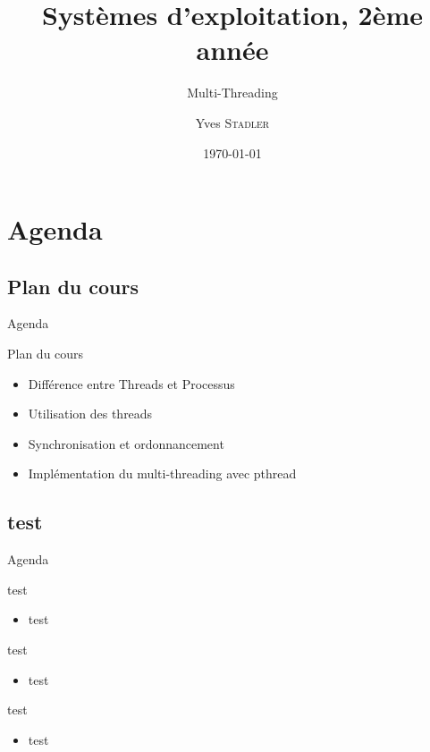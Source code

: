 
\title{Systèmes d'exploitation, 2ème année}
\subtitle{Multi-Threading}

\author{Yves \textsc{Stadler}}

\date{\today}



\begin{frame}
\titlepage
\end{frame}

\def\sectitle{Agenda}
\section{\sectitle}
\def\subsectitle{Plan du cours}
\subsection{\subsectitle}

\begin{frame}{\sectitle}
\begin{block}{\subsectitle}
\begin{itemize}
    \item Différence entre Threads et Processus
    \item Utilisation des threads
    \item Synchronisation et ordonnancement
    \item Implémentation du multi-threading avec pthread
\end{itemize}
\end{block}
\end{frame}

\def\subsectitle{test}
\subsection{\subsectitle}


\begin{frame}{\sectitle}
\begin{alertblock}{\subsectitle}
\begin{itemize}
\item test 
\end{itemize}
\end{alertblock}

\begin{exampleblock}{test}
\begin{itemize}
\item test
\end{itemize}

\end{exampleblock}

\begin{block}{test}
\begin{itemize}
\item test
\end{itemize}

\end{block}

\end{frame}




